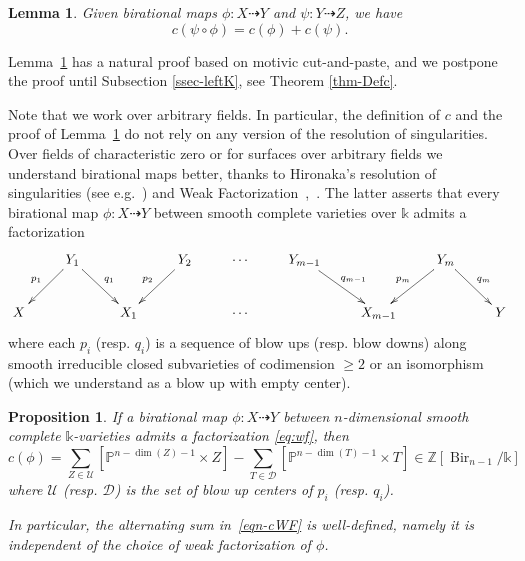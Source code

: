 \documentclass[a4paper,12pt]{amsart}
\def\k{\mathbb k}
\def\P{\mathbb P}
\def\Z{\mathbb Z}
\def\Bir{{\operatorname{Bir}}}
\theoremstyle{plain}
\newtheorem{proposition}[dummy]{Proposition}
\newtheorem{lem}[dummy]{Lemma}
\numberwithin{equation}{section}
\theoremstyle{definition}
\newcommand{\cD}{\mathcal{D}}
\newcommand{\cU}{\mathcal{U}}
\renewcommand{\(}{\left(}
\renewcommand{\)}{\right)}
\newcommand{\dto}{\dashrightarrow}
\begin{document}
\begin{lem}\label{lem-homc}
Given birational maps $\phi : X \dto Y$ and $\psi : Y \dto Z$,
we have
$$c(\psi \circ \phi) = c(\phi) + c(\psi).$$
\end{lem}

Lemma~\ref{lem-homc} has a natural proof
based on motivic cut-and-paste,
and we postpone the proof until Subsection 
\ref{ssec-leftK},
see Theorem \ref{thm-Defc}.


Note that we work over arbitrary fields.
In particular,
the definition of $c$ and the proof of Lemma~\ref{lem-homc}
do not rely on 
any version of the resolution of singularities.
Over fields of characteristic zero 
or for surfaces over arbitrary fields
we understand birational maps better, 
thanks to
Hironaka's resolution of singularities (see e.g.~\cite{KollarRes}) 
and
Weak Factorization~\cite{WF},~\cite[Lemma 54.17.2]{stacks-project}.
The latter asserts that
every birational map $\phi : X \dto Y$
between smooth complete varieties over $\k$
admits a factorization
\begin{equation}\label{eq:wf}
\xymatrix{
 & Y_1 \ar[dr]^{q_1} \ar[dl]_{p_1} & & Y_2 \ar[dl]_{p_2} & \cdots & Y_{m-1} \ar[dr]^{q_{m-1}} & & Y_m  \ar[dr]^{q_m} \ar[dl]_{p_m}  \\
X & & X_1 & & \cdots & & X_{m-1} & & Y \\
}
\end{equation}
where each $p_i$ (resp. $q_i$) is a sequence of blow ups
(resp. blow downs)
along smooth irreducible closed subvarieties
of codimension $\ge 2$ or an isomorphism
(which we understand
as a blow up with empty center).

\begin{proposition}\label{pro-cWF}
If a birational map $\phi: X \dto Y$ between $n$-dimensional
smooth complete $\k$-varieties 
admits
a factorization \eqref{eq:wf},
then 
\begin{equation}\label{eqn-cWF}
c(\phi) = 
\sum_{Z \in \cU} [\P^{n - \dim(Z) - 1} \times Z]
  -  \sum_{T \in \cD} [\P^{n - \dim(T) - 1} \times T]  \in  \Z[\Bir_{n-1}/\k]
\end{equation}
where $\cU$ \textup(resp. $\cD$\textup)
is the set of blow up centers 
of $p_i$ \textup(resp. $q_i$\textup).

In particular, the alternating sum in~\eqref{eqn-cWF} is well-defined, namely it is independent of the
choice of weak factorization of $\phi$.

\end{proposition}
\end{document}
